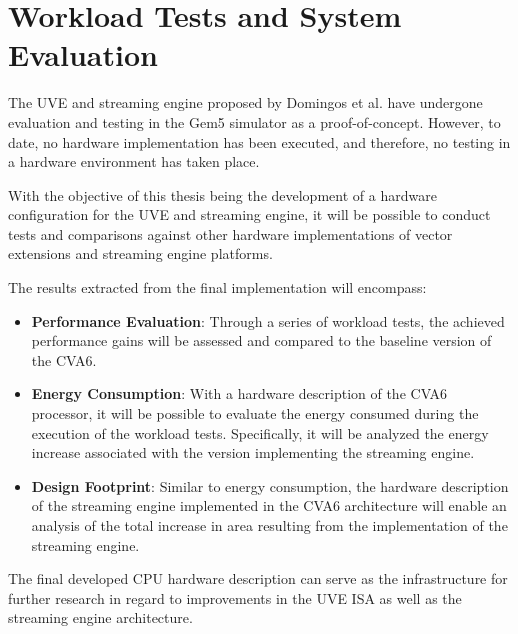 \section{Workload Tests and System Evaluation}
The UVE and streaming engine proposed by Domingos et al. \cite{uve-paper} have undergone evaluation and testing in the Gem5 simulator as a proof-of-concept. However, to date, no hardware implementation has been executed, and therefore, no testing in a hardware environment has taken place.

With the objective of this thesis being the development of a hardware configuration for the UVE and streaming engine, it will be possible to conduct tests and comparisons against other hardware implementations of vector extensions and streaming engine platforms.

The results extracted from the final implementation will encompass:
\begin{itemize}
    \item \textbf{Performance Evaluation}: Through a series of workload tests, the achieved performance gains will be assessed and compared to the baseline version of the CVA6.
    \item \textbf{Energy Consumption}: With a hardware description of the CVA6 processor, it will be possible to evaluate the energy consumed during the execution of the workload tests. Specifically, it will be analyzed the energy increase associated with the version implementing the streaming engine.
    \item \textbf{Design Footprint}: Similar to energy consumption, the hardware description of the streaming engine implemented in the CVA6 architecture will enable an analysis of the total increase in area resulting from the implementation of the streaming engine.
\end{itemize}

The final developed CPU hardware description can serve as the infrastructure for further research in regard to improvements in the UVE ISA as well as the streaming engine architecture. 

